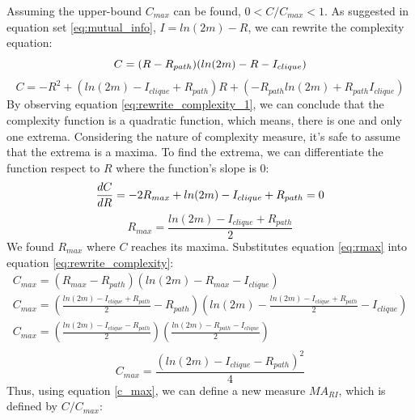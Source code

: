 \documentclass[12pt]{article}
\begin{document}
Assuming the upper-bound $C_{max}$ can be found, $0<C/C_{max}<1$. As suggested in equation set \ref{eq:mutual_info}, $I = ln(2m)-R$, we can rewrite the complexity equation:\\
\begin{equation}
    \label{eq:rewrite_complexity}
     C = (R-R_{path})(ln(2m)-R-I_{clique})\\
\end{equation}
\begin{equation}
    \label{eq:rewrite_complexity_1}
    C = -R^2+(ln(2m)-I_{clique}+R_{path})R+(-R_{path}ln(2m)+R_{path}I_{clique})
\end{equation}
By observing equation \ref{eq:rewrite_complexity_1}, we can conclude that the complexity function is a quadratic function, which means, there is one and only one extrema. Considering the nature of complexity measure, it's safe to assume that the extrema is a maxima. To find the extrema, we can differentiate the function respect to $R$ where the function's slope is 0:
\begin{equation}
    \label{eq:mari_diff}
        \frac{dC}{dR} = -2R_{max}+ln(2m)-I_{clique}+R_{path} = 0\\
\end{equation}
\begin{equation}
    \label{eq:rmax}
    R_{max} = \frac{ln(2m)-I_{clique}+R_{path}}{2}
\end{equation}
\noindent
We found $R_{max}$ where $C$ reaches its maxima. 
Substitutes equation \ref{eq:rmax} into equation \ref{eq:rewrite_complexity}:\\
\begin{equation}
    \begin{gathered}
        C_{max} =(R_{max}-R_{path})(ln(2m)-R_{max}-I_{clique})\\
        C_{max} = (\frac{ln(2m)-I_{clique}+R_{path}}{2}-R_{path})(ln(2m)-\frac{ln(2m)-I_{clique}+R_{path}}{2}-I_{clique})\\
        C_{max} = (\frac{ln(2m)-I_{clique}-R_{path}}{2})(\frac{ln(2m)-R_{path}-I_{clique}}{2})\\
    \end{gathered}
\end{equation}
\begin{equation}
    \label{c_max}
    C_{max} = \frac{(ln(2m)-I_{clique}-R_{path})^2}{4}
\end{equation}
\noindent
Thus, using equation \ref{c_max}, we can define a new measure $MA_{RI}$, which is defined by $C/C_{max}$:\\
\end{document}
